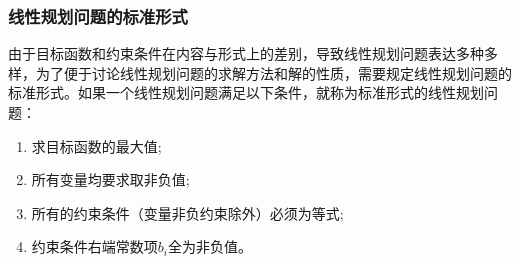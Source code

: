 \subsubsection{线性规划问题的标准形式}
\begin{frame}{\subsubsecname}
 由于目标函数和约束条件在内容与形式上的差别，导致线性规划问题表达多种多样，为了便于讨论线性规划问题的求解方法和解的性质，需要规定线性规划问题的标准形式。如果一个线性规划问题满足以下条件，就称为标准形式的线性规划问题：
 \begin{enumerate}
        \item 求目标函数的最大值;
        \item 所有变量均要求取非负值;
        \item 所有的约束条件（变量非负约束除外）必须为等式;
        \item 约束条件右端常数项$b_i$全为非负值。
\end{enumerate}
\end{frame}

